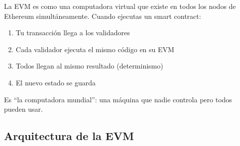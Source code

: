 \documentclass[11pt,a4paper,twoside,openright]{book}
\theoremstyle{definition}
\theoremstyle{plain}
\theoremstyle{remark}
\begin{document}
\begin{intuicion}
La EVM es como una computadora virtual que existe en todos los nodos de Ethereum simultáneamente. Cuando ejecutas un smart contract:
\begin{enumerate}
    \item Tu transacción llega a los validadores
    \item Cada validador ejecuta el mismo código en su EVM
    \item Todos llegan al mismo resultado (determinismo)
    \item El nuevo estado se guarda
\end{enumerate}

Es ``la computadora mundial'': una máquina que nadie controla pero todos pueden usar.
\end{intuicion}

\subsection{Arquitectura de la EVM}
\end{document}
